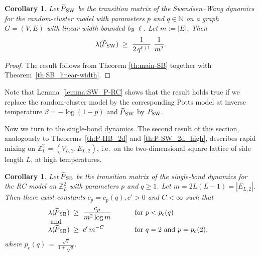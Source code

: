 \documentclass{dis}
\newtheorem{corollary}[theorem]{Corollary}
\theoremstyle{citing}
\begin{document}
\begin{corollary} \label{coro:SW-width}
Let ${{\raisebox{2pt}{ ${\widetilde{{}}}$ }\mkern-14mu P}_{\rm SW}}$ be the transition matrix 
of the Swendsen--Wang dynamics for the random-cluster model 
with parameters $p$ and $q\in{\ensuremath{\mathbb{N}}}$ 
on a graph $G=(V,E)$ with linear width bounded by $\ell$. 
Let $m:={\left\vert {E} \right\vert}$. Then
\begin{equation} \label{eq:coro_SW-width}
\lambda({{\raisebox{2pt}{ ${\widetilde{{}}}$ }\mkern-14mu P}_{\rm SW}})
\;\ge\; \frac{1}{2\, q^{\ell+1}}\ \frac{1}{m^2}.
\vspace{2mm}
\end{equation}
\end{corollary}

\begin{proof}
The result follows from Theorem \ref{th:main-SB} together with 
Theorem~\ref{th:SB_linear-width}.
\end{proof}

Note that Lemma~\ref{lemma:SW_P-RC} shows that 
the result holds true if we replace the random-cluster model by 
the corresponding Potts model at inverse temperature 
$\beta=-\log(1-p)$ and ${{\raisebox{2pt}{ ${\widetilde{{}}}$ }\mkern-14mu P}_{\rm SW}}$ by ${P_{\rm SW}}$.
\vspace{1mm}

Now we turn to the single-bond dynamics. 
The second result of this section, analogously to 
Theorems~\ref{th:P-HB_2d} and \ref{th:P-SW_2d_high}, 
describes rapid mixing on ${\ensuremath{\mathbb{Z}}}^2_L=(V_{L,2},E_{L,2})$, 
i.e.~on the two-dimensional square lattice of side length $L$, 
at high temperatures. 
\goodbreak

\begin{corollary} \label{coro:SB_2d_high}
Let ${{\raisebox{2pt}{ ${\widetilde{{}}}$ }\mkern-14mu P}_{\rm SB}}$ be the transition matrix of the 
single-bond dynamics for the RC model 
on ${\ensuremath{\mathbb{Z}}}^2_L$ with parameters $p$ and $q\ge1$.
Let $m=2L(L-1)={\left\vert {E_{L,2}} \right\vert}$. 
Then there exist constants $c_p=c_p(q),c'>0$ and $C<\infty$ 
such that
\begin{align*}
\lambda({{\raisebox{2pt}{ ${\widetilde{{}}}$ }\mkern-14mu P}_{\rm SB}}) \;&\ge\; \frac{c_p}{m^2 \log m} \qquad\quad
	\text{ for } p < p_c(q) \hspace*{2cm}\\[-3mm]
\intertext{\vspace*{-2mm} and}
\lambda({{\raisebox{2pt}{ ${\widetilde{{}}}$ }\mkern-14mu P}_{\rm SB}}) \;&\ge\; c'\,m^{-C} \qquad\qquad 	
	\text{ for } q=2 \text{ and } p = p_c(2),
\end{align*}
where $p_c(q)\,=\,\frac{\sqrt{q}}{1+\sqrt{q}}$.
\end{corollary}
\end{document}
